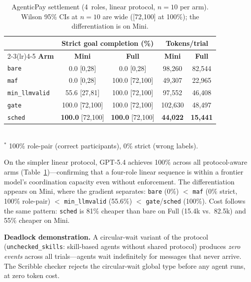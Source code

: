 \begin{table}[t]
\centering\small
\caption{AgenticPay settlement (4~roles, linear protocol, $n = 10$
per arm).
Wilson 95\% CIs at $n{=}10$ are wide ([72,100] at 100\%); the
differentiation is on Mini.}
\label{tab:agenticpay}
\begin{tabular}{@{}l cc cc@{}}
\toprule
& \multicolumn{2}{c}{\textbf{Strict goal completion (\%)}}
& \multicolumn{2}{c}{\textbf{Tokens/trial}} \\
\cmidrule(lr){2-3}\cmidrule(lr){4-5}
\textbf{Arm} & \textbf{Mini} & \textbf{Full}
             & \textbf{Mini} & \textbf{Full} \\
\midrule
\texttt{bare}
  & 0.0 {\scriptsize [0,28]} & 0.0 {\scriptsize [0,28]}
  & 98{,}260 & 82{,}544 \\
\texttt{maf}
  & 0.0\rlap{$^*$} {\scriptsize [0,28]} & 100.0 {\scriptsize [72,100]}
  & 49{,}307 & 22{,}965 \\
\texttt{min\_llmvalid}
  & 55.6 {\scriptsize [27,81]} & 100.0 {\scriptsize [72,100]}
  & 97{,}552 & 46{,}408 \\
\texttt{gate}
  & 100.0 {\scriptsize [72,100]} & 100.0 {\scriptsize [72,100]}
  & 102{,}630 & 48{,}497 \\
\texttt{sched}
  & \textbf{100.0} {\scriptsize [72,100]} & \textbf{100.0} {\scriptsize [72,100]}
  & \textbf{44{,}022} & \textbf{15{,}441} \\
\bottomrule
\end{tabular}
\\[4pt]
{\footnotesize $^*$ 100\% role-pair (correct participants), 0\% strict (wrong labels).}
\end{table}

On the simpler linear protocol, GPT-5.4 achieves 100\% across all
protocol-aware arms (Table~\ref{tab:agenticpay})---confirming that a
four-role linear sequence is within a frontier model's coordination
capacity even without enforcement.
The differentiation appears on Mini, where the gradient separates:
\texttt{bare} (0\%) $<$ \texttt{maf} (0\% strict, 100\% role-pair)
$<$ \texttt{min\_llmvalid} (55.6\%)
$<$ \texttt{gate}/\texttt{sched} (100\%).
Cost follows the same pattern: \texttt{sched} is 81\% cheaper than bare
on Full (15.4k vs.\ 82.5k) and 55\% cheaper on Mini.

\textbf{Deadlock demonstration.}
A circular-wait variant of the protocol (\texttt{unchecked\_skills}:
skill-based agents without shared protocol) produces \emph{zero events}
across all trials---agents wait indefinitely for messages that never
arrive.
The Scribble checker rejects the circular-wait global type before any
agent runs, at zero token cost.

